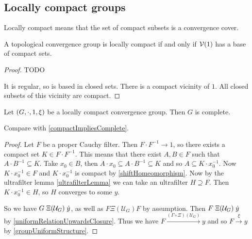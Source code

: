 \subsection{Locally compact groups}
Locally compact means that the set of compact subsets is a convergence cover.

\begin{lemma}
A topological convergence group is locally compact \textup{if and only if} $\operatorname{\mathcal{V}}(1)$ has a base of compact sets.
\end{lemma}
\begin{proof}
TODO 

It is regular, so is based in closed sets. There is a compact vicinity of $1$. All closed subsets of this vicinity are compact.
\end{proof}

\begin{proposition}
Let $\left( G, \cdot, 1, \xi \right)$ be a locally compact convergence group. Then $G$ is complete.
\end{proposition}
Compare with \ref{compactImpliesComplete}.
\begin{proof}
Let $F$ be a proper Cauchy filter. Then $F\cdot F^{-1} \to 1$, so there exists a compact set $K\in F\cdot F^{-1}$. This means that there exist $A, B \in F$ such that $A\cdot B^{-1} \subseteq K$. Take $x_0 \in B$, then $A\cdot x_0 \subseteq A\cdot B^{-1} \subseteq K$ and so $A \subseteq K\cdot x_0^{-1}$. Now $K\cdot x_0^{-1}\in F$ and $K\cdot x_0^{-1}$ is compact by \ref{shiftHomeomorphism}. Now by the ultrafilter lemma \ref{ultrafilterLemma} we can take an ultrafilter $H \supseteq F$. Then $K\cdot x_0^{-1} \in H$, so $H$ converges to some $y$.

So we have $G\mathrel{\Xi(\mathcal{U}_G)} \dot{y}$, as well as $F\mathrel{\Xi(\mathcal{U}_G)} F$ by assumption. Then $F\mathrel{\Xi(\mathcal{U}_G)} \dot{y}$ by \ref{uniformRelationUpwardsClosure}. Thus we have $F \overset{(\Gamma\circ \Xi)(\mathcal{U}_G)}{\longrightarrow} y$ and so $F\overset{\xi}{\longrightarrow} y$ by \ref{groupUniformStructure}.
\end{proof}

